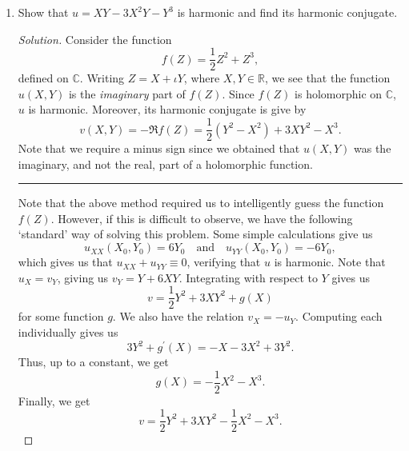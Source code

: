 \documentclass[11pt]{article}
\theoremstyle{definition}
\newenvironment{soln}{\begin{proof}[Solution]}{\end{proof}}
\begin{document}
\begin{enumerate}[leftmargin=*]
\begin{soln}
        Now, since $v(X,Y)$ is a harmonic conjugate of $u(X,Y)$, we have that $-u(X,Y)$ is a harmonic conjugate of $v(X,Y)$ (Why?). Since we also have that $u(X,Y)$ is a harmonic conjugate of $v(X,Y)$, it follows that $u$ and $-u$ differ only by a constant, and hence $u$ must itself be constant. The same holds for $v$.
    \end{soln}
    
    \item Show that $u = XY - 3X^2Y - Y^3$ is harmonic and find its harmonic conjugate.
    \begin{soln}
        Consider the function 
        \[
            f(Z) = \frac{1}{2}Z^2 + Z^3,
        \]
        defined on $\mathbb{C}$. Writing $Z = X + \iota Y$, where $X,Y \in \mathbb{R}$, we see that the function $u(X,Y)$ is the \emph{imaginary} part of $f(Z)$. Since $f(Z)$ is holomorphic on $\mathbb{C}$, $u$ is harmonic. Moreover, its harmonic conjugate is give by
        \[
            v(X,Y) = -\mathfrak{R} f(Z) = \frac{1}{2} (Y^2 - X^2) + 3XY^2 - X^3.
        \]
        Note that we require a minus sign since we obtained that $u(X,Y)$ was the imaginary, and not the real, part of a holomorphic function. 
        \par\noindent\rule{\textwidth}{0.2pt}
        
        Note that the above method required us to intelligently guess the function $f(Z)$. However, if this is difficult to observe, we have the following `standard' way of solving this problem. Some simple calculations give us
        \[
            u_{XX}(X_0,Y_0) = 6Y_0 \quad \text{and} \quad u_{YY}(X_0, Y_0) = -6Y_0,
        \]
        which gives us that $u_{XX} + u_{YY} \equiv 0$, verifying that $u$ is harmonic. Note that $u_X = v_Y$, giving us $v_Y = Y + 6XY$. Integrating with respect to $Y$ gives us
        \[
            v = \frac{1}{2} Y^2 + 3XY^2 + g(X)
        \]
        for some function $g$. We also have the relation $v_X = -u_Y$. Computing each individually gives us
        \[
            3Y^2 + g^{\prime}(X) = -X - 3X^2 + 3Y^2.
        \]
        Thus, up to a constant, we get
        \[
            g(X) = -\frac{1}{2}X^2 - X^3.
        \]
        Finally, we get
        \[
            v = \frac{1}{2}Y^2 + 3XY^2 - \frac{1}{2}X^2 - X^3. 
        \] \qedhere
    \end{soln}
    

\end{enumerate}
\end{document}

